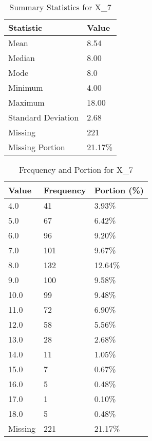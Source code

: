 \begin{table}[H]
\centering
\begin{tabular}{|l|l|}
\hline
\textbf{Statistic} & \textbf{Value} \\ \hline
Mean               & 8.54 \\ \hline
Median             & 8.00 \\ \hline
Mode               & 8.0 \\ \hline
Minimum            & 4.00 \\ \hline
Maximum            & 18.00 \\ \hline
Standard Deviation & 2.68 \\ \hline
Missing            & 221 \\ \hline
Missing Portion    & 21.17\% \\ \hline
\end{tabular}
\caption{Summary Statistics for X_7}
\end{table}

\begin{table}[H]
\centering
\begin{tabular}{|l|l|l|}
\hline
\textbf{Value} & \textbf{Frequency} & \textbf{Portion (\%)} \\ \hline
4.0 & 41 & 3.93\% \\ \hline
5.0 & 67 & 6.42\% \\ \hline
6.0 & 96 & 9.20\% \\ \hline
7.0 & 101 & 9.67\% \\ \hline
8.0 & 132 & 12.64\% \\ \hline
9.0 & 100 & 9.58\% \\ \hline
10.0 & 99 & 9.48\% \\ \hline
11.0 & 72 & 6.90\% \\ \hline
12.0 & 58 & 5.56\% \\ \hline
13.0 & 28 & 2.68\% \\ \hline
14.0 & 11 & 1.05\% \\ \hline
15.0 & 7 & 0.67\% \\ \hline
16.0 & 5 & 0.48\% \\ \hline
17.0 & 1 & 0.10\% \\ \hline
18.0 & 5 & 0.48\% \\ \hline
Missing & 221 & 21.17\% \\ \hline
\end{tabular}
\caption{Frequency and Portion for X_7}
\end{table}

